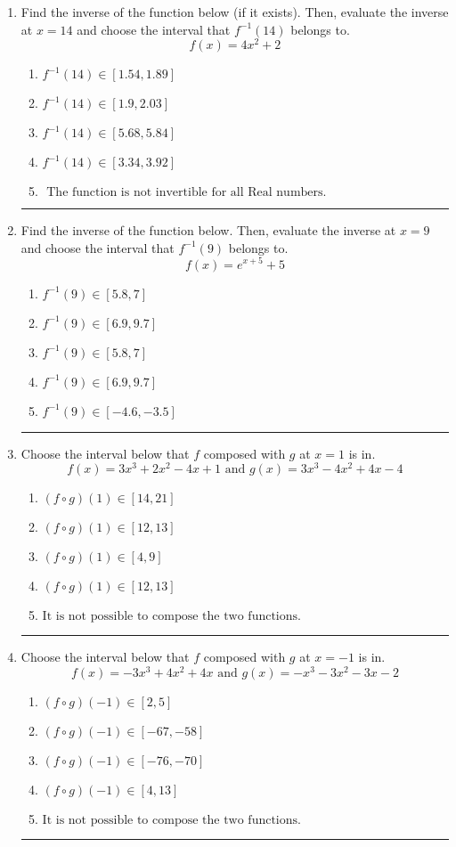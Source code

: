 \documentclass[14pt]{extbook}
\newcommand{\litem}[1]{\item#1\hspace*{-1cm}\rule{\textwidth}{0.4pt}}
\begin{document}
\begin{enumerate}
{\begin{enumerate}[label=\Alph*.]
\end{enumerate} }
\litem{
Find the inverse of the function below (if it exists). Then, evaluate the inverse at $x = 14$ and choose the interval that $f^{-1}(14)$ belongs to.\[ f(x) = 4 x^2 + 2 \]\begin{enumerate}[label=\Alph*.]
\item \( f^{-1}(14) \in [1.54, 1.89] \)
\item \( f^{-1}(14) \in [1.9, 2.03] \)
\item \( f^{-1}(14) \in [5.68, 5.84] \)
\item \( f^{-1}(14) \in [3.34, 3.92] \)
\item \( \text{ The function is not invertible for all Real numbers. } \)

\end{enumerate} }
\litem{
Find the inverse of the function below. Then, evaluate the inverse at $x = 9$ and choose the interval that $f^{-1}(9)$ belongs to.\[ f(x) = e^{x+5}+5 \]\begin{enumerate}[label=\Alph*.]
\item \( f^{-1}(9) \in [5.8, 7] \)
\item \( f^{-1}(9) \in [6.9, 9.7] \)
\item \( f^{-1}(9) \in [5.8, 7] \)
\item \( f^{-1}(9) \in [6.9, 9.7] \)
\item \( f^{-1}(9) \in [-4.6, -3.5] \)

\end{enumerate} }
\litem{
Choose the interval below that $f$ composed with $g$ at $x=1$ is in.\[ f(x) = 3x^{3} +2 x^{2} -4 x + 1 \text{ and } g(x) = 3x^{3} -4 x^{2} +4 x -4 \]\begin{enumerate}[label=\Alph*.]
\item \( (f \circ g)(1) \in [14, 21] \)
\item \( (f \circ g)(1) \in [12, 13] \)
\item \( (f \circ g)(1) \in [4, 9] \)
\item \( (f \circ g)(1) \in [12, 13] \)
\item \( \text{It is not possible to compose the two functions.} \)

\end{enumerate} }
\litem{
Choose the interval below that $f$ composed with $g$ at $x=-1$ is in.\[ f(x) = -3x^{3} +4 x^{2} +4 x \text{ and } g(x) = -x^{3} -3 x^{2} -3 x -2 \]\begin{enumerate}[label=\Alph*.]
\item \( (f \circ g)(-1) \in [2, 5] \)
\item \( (f \circ g)(-1) \in [-67, -58] \)
\item \( (f \circ g)(-1) \in [-76, -70] \)
\item \( (f \circ g)(-1) \in [4, 13] \)
\item \( \text{It is not possible to compose the two functions.} \)


\end{enumerate}}
\end{enumerate}
\end{document}
